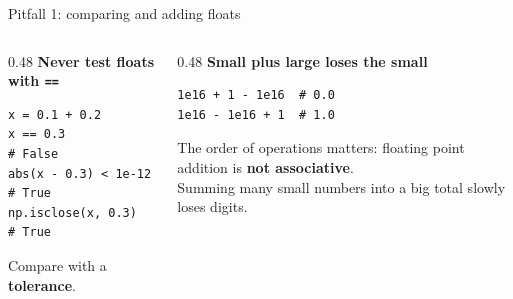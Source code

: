 \documentclass[aspectratio=169]{beamer}
\begin{document}
\begin{frame}[fragile]{Pitfall 1: comparing and adding floats}
\begin{columns}[T]
\begin{column}{0.48\textwidth}
\textbf{Never test floats with \texttt{==}}
\begin{lstlisting}
x = 0.1 + 0.2
x == 0.3              # False
abs(x - 0.3) < 1e-12  # True
np.isclose(x, 0.3)    # True
\end{lstlisting}
\small Compare with a \textbf{tolerance}.
\end{column}
\begin{column}{0.48\textwidth}
\textbf{Small plus large loses the small}
\begin{lstlisting}
1e16 + 1 - 1e16  # 0.0
1e16 - 1e16 + 1  # 1.0
\end{lstlisting}
\small The order of operations matters: floating point addition is \textbf{not associative}.\\[4pt]
Summing many small numbers into a big total slowly loses digits.
\end{column}
\end{columns}
\end{frame}
\end{document}
